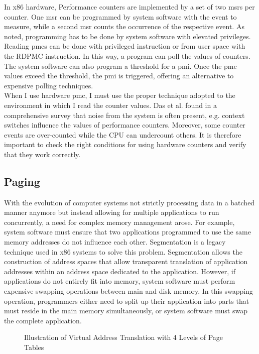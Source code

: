 In x86 hardware, Performance counters are implemented by a set of two
\glspl{msr} per counter. One \gls{msr} can be programmed by system software with
the event to measure, while a second \gls{msr} counts the occurrence of the
respective event. As noted, programming has to be done by system software with
elevated privileges. Reading \glspl{pmc} can be done with privileged instruction
or from user space with the RDPMC instruction. In this way, a program can poll
the values of counters. The system software can also program a threshold for a
\gls{pmi}. Once the \gls{pmc} values exceed the threshold, the \gls{pmi} is
triggered, offering an alternative to expensive polling techniques.\\

When I use hardware \gls{pmc}, I must use the proper technique adopted to
the environment in which I read the counter values. Das et al. found in a
comprehensive survey that noise from the system is often present, e.g. context
switches influence the values of performance counters. \cite{das_sok_2019}
Moreover, some counter events are over-counted while the CPU can undercount
others.\cite{weaver_non-determinism_2013} It is therefore important to check the
right conditions for using hardware counters and verify that they work
correctly.

\subsection{Paging}
\label{sec:state:technical:paging}
With the evolution of computer systems not strictly processing data in a batched
manner anymore but instead allowing for multiple applications to run
concurrently, a need for complex memory management arose. For example, system
software must ensure that two applications programmed to use the same memory
addresses do not influence each other. Segmentation is a legacy technique used
in x86 systems to solve this problem. Segmentation allows the construction of
address spaces that allow transparent translation of application addresses
within an address space dedicated to the application. However, if applications
do not entirely fit into memory, system software must perform expensive swapping
operations between main and disk memory. In this swapping operation, programmers
either need to split up their application into parts that must reside in the
main memory simultaneously, or system software must swap the complete
application.\\

\begin{figure}
    \begin{center}
        
        \caption{Illustration of Virtual Address Translation with 4 Levels of Page Tables}
        \label{fig:state:technical:paging}
    \end{center}
\end{figure}


